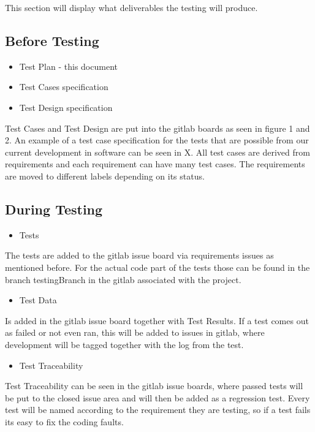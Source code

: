 
This section will display what deliverables the testing will produce.

\subsection{Before Testing}
\begin{itemize}
    \item Test Plan - this document
    \item{Test Cases specification}
    \item{Test Design specification}
\end{itemize}
Test Cases and Test Design are put into the gitlab boards as seen in figure 1 and 2. An example of a test case specification for the tests that are possible from our current development in software can be seen in X. All test cases are derived from requirements and each requirement can have many test cases. The requirements are moved to different labels depending on its status.  




\subsection{During Testing}
\begin{itemize}
    \item Tests
\end{itemize}
The tests are added to the gitlab issue board via requirements issues as mentioned before. For the actual code part of the tests those can be found in the branch testingBranch in the gitlab associated with the project. 
\begin{itemize}
    
    \item{Test Data}
\end{itemize}
Is added in the gitlab issue board together with Test Results. If a test comes out as failed or not even ran, this will be added to issues in gitlab, where development will be tagged together with the log from the test.
\begin{itemize}

    \item{Test Traceability}
\end{itemize}
Test Traceability can be seen in the gitlab issue boards, where passed tests will be put to the closed issue area and will then be added as a regression test. Every test will be named according to the requirement they are testing, so if a test fails its easy to fix the coding faults.

